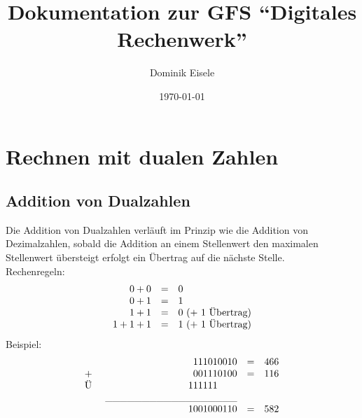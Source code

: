 \documentclass[a4paper,12pt,fleqn,oneside]{article}
\author{Dominik Eisele}
\title{Dokumentation zur GFS "`Digitales Rechenwerk"'}
\date{\today}
\begin{document}
\normalem

\begin{titlepage}
	\maketitle
\end{titlepage}

	\tableofcontents

\newpage


	\section{Rechnen mit dualen Zahlen}
	\subsection{Addition von Dualzahlen}
		Die Addition von Dualzahlen verläuft im Prinzip wie die Addition von Dezimalzahlen, sobald die Addition an einem
		Stellenwert den maximalen Stellenwert übersteigt erfolgt ein Übertrag auf die nächste Stelle.\\
		Rechenregeln:
		\[ \begin{array}{rcll}
   				 0 + 0 & = & 0													\\
  			         0 + 1 & = & 1													\\
    				 1 + 1 & = & 0$ (+ 1 Übertrag)$										\\
    			   1 + 1 + 1 & = & 1$ (+ 1 Übertrag)$
		\end{array} \]
		Beispiel:
		\[ \begin{array}{lrcll}
   					&		 	       	 1 1 1 0 1 0 0 1 0 		 	 & = & 466 		\\
  			       	$+ $ &				 0 0 1 1 1 0 1 0 0			 & = & 116		\\
  			       	$Ü $ &      			      1 1 1 1 1 1$ $$ $$ $$ $$ $$ $         				\\
    					&	\_\_\_\_\_\_\_\_\_\_\_\_\_\_\_\_\_\_							\\
    			   		&			      1 0 0 1 0 0 0 1 1 0			 & = & 582
		\end{array} \]

\newpage
\end{document}
